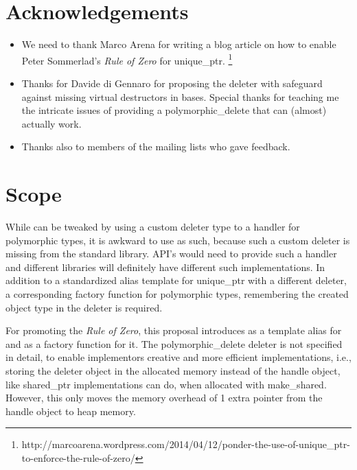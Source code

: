 \documentclass[ebook,11pt,article]{memoir}
\begin{document}
\chapter{Acknowledgements}
\begin{itemize}
\item We need to thank Marco Arena for writing a blog article on how to enable Peter Sommerlad's \emph{Rule of Zero} for unique_ptr. 
\footnote{{http://marcoarena.wordpress.com/2014/04/12/ponder-the-use-of-unique_ptr-to-enforce-the-rule-of-zero/}}
\item Thanks for Davide di Gennaro for proposing the deleter with safeguard against missing virtual destructors in bases. Special thanks for teaching me the intricate issues of providing a polymorphic_delete that can (almost) actually work.
\item Thanks also to members of the mailing lists who gave feedback. 
\end{itemize}

\chapter{Scope}

While  can be tweaked by using a custom deleter type to a handler for polymorphic types, it is awkward to use as such, because such a custom deleter is missing from the standard library. API's would need to provide such a handler and different libraries will definitely have different such implementations. In addition to a standardized alias template for unique_ptr with a different deleter, a corresponding factory function for polymorphic types, remembering the created object type in the deleter is required.

For promoting the \emph{Rule of Zero}, this proposal introduces  as a template alias for  and  as a factory function for it. The polymorphic_delete deleter is not specified in detail, to enable implementors creative and more efficient implementations, i.e., storing the deleter object in the allocated memory instead of the handle object, like shared_ptr implementations can do, when allocated with make_shared. However, this only moves the memory overhead of 1 extra pointer from the handle object to heap memory.
\end{document}
